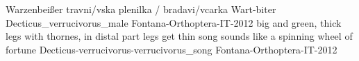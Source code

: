 {Warzenbeißer} %
{travni/v{s}ka plenilka / bradavi/v{c}arka} %
{Wart-biter} %
{Decticus_verrucivorus_male} {Fontana-Orthoptera-IT-2012} %
{} {} %
{big and green, thick legs with thornes, in distal part legs get thin} %
{song sounds like a spinning wheel of fortune} %
{Decticus-verrucivorus-verrucivorus_song} {Fontana-Orthoptera-IT-2012} %